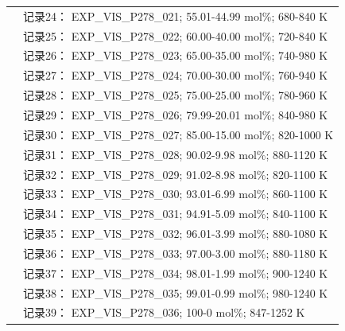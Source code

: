 \documentclass[12pt]{article}
\begin{document}
{\begin{longtable}[]{@{}
  >{\raggedright\arraybackslash}p{}
  >{\raggedright\arraybackslash}p{}@{}}
 & 记录24： EXP\_VIS\_P278\_021; 55.01-44.99 mol\%; 680-840 K \\
 & 记录25： EXP\_VIS\_P278\_022; 60.00-40.00 mol\%; 720-840 K \\
 & 记录26： EXP\_VIS\_P278\_023; 65.00-35.00 mol\%; 740-980 K \\
 & 记录27： EXP\_VIS\_P278\_024; 70.00-30.00 mol\%; 760-940 K \\
 & 记录28： EXP\_VIS\_P278\_025; 75.00-25.00 mol\%; 780-960 K \\
 & 记录29： EXP\_VIS\_P278\_026; 79.99-20.01 mol\%; 840-980 K \\
 & 记录30： EXP\_VIS\_P278\_027; 85.00-15.00 mol\%; 820-1000 K \\
 & 记录31： EXP\_VIS\_P278\_028; 90.02-9.98 mol\%; 880-1120 K \\
 & 记录32： EXP\_VIS\_P278\_029; 91.02-8.98 mol\%; 820-1100 K \\
 & 记录33： EXP\_VIS\_P278\_030; 93.01-6.99 mol\%; 860-1100 K \\
 & 记录34： EXP\_VIS\_P278\_031; 94.91-5.09 mol\%; 840-1100 K \\
 & 记录35： EXP\_VIS\_P278\_032; 96.01-3.99 mol\%; 880-1080 K \\
 & 记录36： EXP\_VIS\_P278\_033; 97.00-3.00 mol\%; 880-1180 K \\
 & 记录37： EXP\_VIS\_P278\_034; 98.01-1.99 mol\%; 900-1240 K \\
 & 记录38： EXP\_VIS\_P278\_035; 99.01-0.99 mol\%; 980-1240 K \\
 & 记录39： EXP\_VIS\_P278\_036; 100-0 mol\%; 847-1252 K  \\


\end{longtable}}
\end{document}
